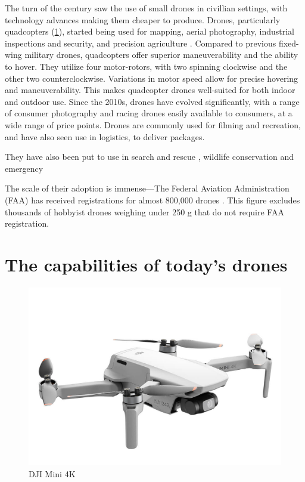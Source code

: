 The turn of the century saw the use of small drones in civillian settings, with
technology advances making them cheaper to produce. Drones, particularly
quadcopters (\cref{fig:dji-mini-4k}), started being used for mapping, aerial
photography, industrial inspections and security, and precision agriculture
\cite{giones2017}. Compared to previous fixed-wing military drones, quadcopters
offer superior maneuverability and the ability to hover. They utilize four
motor-rotors, with two spinning clockwise and the other two counterclockwise.
Variations in motor speed allow for precise hovering and maneuverability. This
makes quadcopter drones well-suited for both indoor and outdoor use.  Since the
2010s, drones have evolved significantly, with a range of consumer photography
and racing drones easily available to consumers, at a wide range of price
points. Drones are commonly used for filming and recreation, and have also seen
use in logistics, to deliver packages.

They have also been put to use in search and rescue
\cite{scherer2015}\cite{tomic2012}, wildlife conservation \cite{gemert2015} and
emergency

The scale of their adoption is
immense---The Federal Aviation Administration (FAA) has received registrations
for almost 800,000 drones \cite{faa_drones_2024}.  This figure excludes
thousands of hobbyist drones weighing under 250 g that do not require FAA
registration.

\section{The capabilities of today's drones}
\label{sec:drone-capabilities}

\begin{figure}[htbp]
\centerline{\includegraphics[width = .5\textwidth]{figs/dji-mini-4k.jpg}}
\caption{DJI Mini 4K}
\label{fig:dji-mini-4k}
\end{figure}

